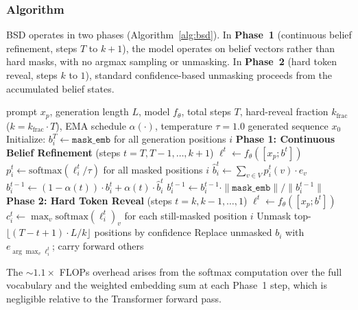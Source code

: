 \documentclass{article}
\begin{document}
\subsubsection{Algorithm}

BSD operates in two phases (Algorithm~\ref{alg:bsd}). In \textbf{Phase~1} (continuous belief refinement, steps $T$ to $k{+}1$), the model operates on belief vectors rather than hard masks, with no argmax sampling or unmasking. In \textbf{Phase~2} (hard token reveal, steps $k$ to $1$), standard confidence-based unmasking proceeds from the accumulated belief states.

\begin{algorithm}[t]
\caption{Belief-State Diffusion (BSD)}
\label{alg:bsd}
\begin{algorithmic}[1]
\Require prompt $x_p$, generation length $L$, model $f_\theta$, total steps $T$, hard-reveal fraction $k_\text{frac}$ ($k = k_\text{frac} \cdot T$), EMA schedule $\alpha(\cdot)$, temperature $\tau = 1.0$
\Ensure generated sequence $x_0$
\State Initialize: $b_i^T \leftarrow \texttt{mask\_emb}$ for all generation positions $i$
\Statex \textbf{Phase 1: Continuous Belief Refinement} (steps $t = T, T{-}1, \ldots, k{+}1$)
    \State $\ell^t \leftarrow f_\theta([x_p; b^t])$ 
    \State $p_i^t \leftarrow \text{softmax}(\ell_i^t / \tau)$ for all masked positions $i$
    \State $\hat{b}_i^t \leftarrow \sum_{v \in V} p_i^t(v) \cdot e_v$ 
    \State $b_i^{t-1} \leftarrow (1 - \alpha(t)) \cdot b_i^t + \alpha(t) \cdot \hat{b}_i^t$ 
    \State $b_i^{t-1} \leftarrow b_i^{t-1} \cdot \|\texttt{mask\_emb}\| / \|b_i^{t-1}\|$ 
\EndFor
\Statex \textbf{Phase 2: Hard Token Reveal} (steps $t = k, k{-}1, \ldots, 1$)
    \State $\ell^t \leftarrow f_\theta([x_p; b^t])$
    \State $c_i^t \leftarrow \max_v \text{softmax}(\ell_i^t)_v$ for each still-masked position $i$
    \State Unmask top-$\lfloor (T-t+1) \cdot L / k \rfloor$ positions by confidence
    \State Replace unmasked $b_i$ with $e_{\arg\max_v \ell_i^t}$; carry forward others
\EndFor
\end{algorithmic}
\end{algorithm}

The ${\sim}1.1{\times}$ FLOPs overhead arises from the softmax computation over the full vocabulary and the weighted embedding sum at each Phase~1 step, which is negligible relative to the Transformer forward pass.
\end{document}
